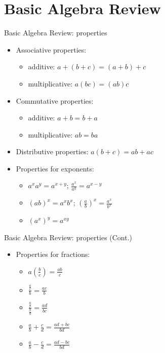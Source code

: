 \documentclass{beamer}
\begin{document}
\section{Basic Algebra Review}%
\label{sec:basic_algebra_review}

\begin{frame}[t]{Basic Algebra Review: properties}
    \begin{itemize}
        \item Associative properties:
	    \begin{itemize}
		\item additive: $a + \left( b+c \right) = \left( a+b \right) +c$
		\item multiplicative: $a\left( bc \right) = \left( ab \right) c$
	    \end{itemize}
	\item Commutative properties:
	    \begin{itemize}
		\item additive: $a+b = b+a$
		\item multiplicative: $ab = ba$
	    \end{itemize}
	\item Distributive properties: $a\left( b+c \right) = ab + ac$
	\item Properties for exponents:
	    \begin{itemize}
	        \item $a^{x} a^{y} = a^{x+y} $; $\frac{a^{x} }{a^{y} } = a^{x-y} $
		\item $\left( ab \right)^{x} = a^{x} b^{x} $; $\left( \frac{a}{b}  \right)^{x} = \frac{a^{x} }{b^{x} } $
		\item $\left( a^{x}  \right)^{y} = a^{xy} $
	    \end{itemize}
    \end{itemize}
\end{frame}

\begin{frame}[t]{Basic Algebra Review: properties (Cont.)}
    \begin{itemize}
        \item Properties for fractions:
	    \begin{itemize}
		\item $a\left( \frac{b}{c}  \right) = \frac{ab}{c} $
		    \vspace{0.5em}
		\item $\frac{\frac{a}{c} }{b} = \frac{ac}{b} $
		    \vspace{0.5em}
		\item $\frac{\frac{a}{c} }{\frac{b}{d} } = \frac{ad}{bc} $
		    \vspace{0.5em}
		\item $\frac{a}{b} + \frac{c}{d} = \frac{ad + bc}{bd} $
		\item $\frac{a}{b} - \frac{c}{d} = \frac{ad - bc}{bd} $
	    \end{itemize}
    \end{itemize}
\end{frame}
\end{document}
